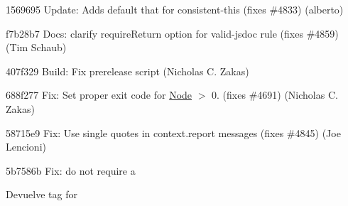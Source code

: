 \begin{DoxyItemize}
\item 1569695 Update\+: Adds default \textquotesingle{}that\textquotesingle{} for consistent-\/this (fixes \#4833) (alberto)
\item f7b28b7 Docs\+: clarify {\ttfamily require\+Return} option for valid-\/jsdoc rule (fixes \#4859) (Tim Schaub)
\item 407f329 Build\+: Fix prerelease script (Nicholas C. Zakas)
\item 688f277 Fix\+: Set proper exit code for \mbox{\hyperlink{class_node}{Node}} $>$ 0. (fixes \#4691) (Nicholas C. Zakas)
\item 58715e9 Fix\+: Use single quotes in context.\+report messages (fixes \#4845) (Joe Lencioni)
\item 5b7586b Fix\+: do not require a \begin{DoxyReturn}{Devuelve}
tag for 
\end{DoxyReturn}

\end{DoxyItemize}